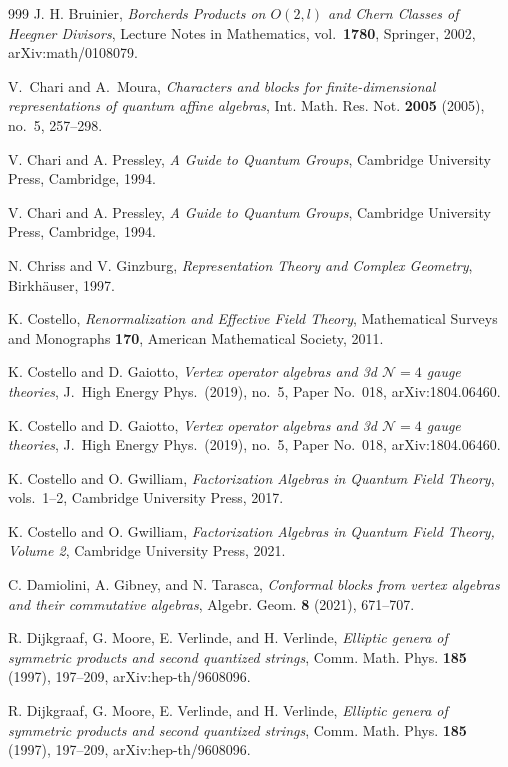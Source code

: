 \begin{thebibliography}{999}
J. H. Bruinier, \emph{Borcherds Products on $O(2,l)$ and Chern Classes of Heegner Divisors}, Lecture Notes in Mathematics, vol.~\textbf{1780}, Springer, 2002, arXiv:math/0108079.

V.~Chari and A.~Moura, \emph{Characters and blocks for finite-dimensional representations of quantum affine algebras}, Int. Math. Res. Not. \textbf{2005} (2005), no.~5, 257--298.

V. Chari and A. Pressley, \emph{A Guide to Quantum Groups}, Cambridge University Press, Cambridge, 1994.

V. Chari and A. Pressley, \emph{A Guide to Quantum Groups}, Cambridge University Press, Cambridge, 1994.

N. Chriss and V. Ginzburg, \emph{Representation Theory and Complex Geometry}, Birkh\"auser, 1997.

K. Costello, \emph{Renormalization and Effective Field Theory}, Mathematical Surveys and Monographs \textbf{170}, American Mathematical Society, 2011.

K. Costello and D. Gaiotto, \emph{Vertex operator algebras and 3d $\mathcal{N}=4$ gauge theories}, J.\ High Energy Phys.\ (2019), no.~5, Paper No.~018, arXiv:1804.06460.

K. Costello and D. Gaiotto, \emph{Vertex operator algebras and 3d $\mathcal{N}=4$ gauge theories}, J.\ High Energy Phys.\ (2019), no.~5, Paper No.~018, arXiv:1804.06460.

K. Costello and O. Gwilliam, \emph{Factorization Algebras in Quantum Field Theory}, vols.~1--2, Cambridge University Press, 2017.

K. Costello and O. Gwilliam, \emph{Factorization Algebras in Quantum Field Theory, Volume 2}, Cambridge University Press, 2021.

C. Damiolini, A. Gibney, and N. Tarasca, \emph{Conformal blocks from vertex algebras and their commutative algebras}, Algebr. Geom. \textbf{8} (2021), 671--707.

R. Dijkgraaf, G. Moore, E. Verlinde, and H. Verlinde, \emph{Elliptic genera of symmetric products and second quantized strings}, Comm. Math. Phys. \textbf{185} (1997), 197--209, arXiv:hep-th/9608096.

R. Dijkgraaf, G. Moore, E. Verlinde, and H. Verlinde, \emph{Elliptic genera of symmetric products and second quantized strings}, Comm. Math. Phys. \textbf{185} (1997), 197--209, arXiv:hep-th/9608096.


\end{thebibliography}
